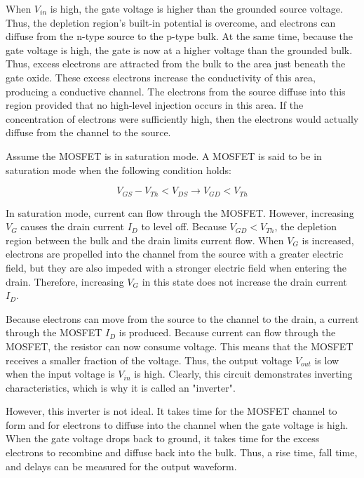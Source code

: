 When $V_{in}$ is high, the gate voltage is higher than the grounded source voltage. Thus, the depletion region's built-in potential is overcome, and electrons can diffuse from the n-type source to the p-type bulk. At the same time, because the gate voltage is high, the gate is now at a higher voltage than the grounded bulk. Thus, excess electrons are attracted from the bulk to the area just beneath the gate oxide. These excess electrons increase the conductivity of this area, producing a conductive channel. The electrons from the source diffuse into this region provided that no high-level injection occurs in this area. If the concentration of electrons were sufficiently high, then the electrons would actually diffuse from the channel to the source.

Assume the MOSFET is in saturation mode. A MOSFET is said to be in saturation mode when the following condition holds:

\begin{equation}
	\label{eq:sat_mode}
	V_{GS} - V_{Th} < V_{DS} \rightarrow V_{GD} < V_{Th}
\end{equation}

In saturation mode, current can flow through the MOSFET. However, increasing $V_{G}$ causes the drain current $I_{D}$ to level off. Because $V_{GD} < V_{Th}$, the depletion region between the bulk and the drain limits current flow. When $V_{G}$ is increased, electrons are propelled into the channel from the source with a greater electric field, but they are also impeded with a stronger electric field when entering the drain. Therefore, increasing $V_{G}$ in this state does not increase the drain current $I_D$.

Because electrons can move from the source to the channel to the drain, a current through the MOSFET $I_D$ is produced. Because current can flow through the MOSFET, the resistor can now consume voltage. This means that the MOSFET receives a smaller fraction of the voltage. Thus, the output voltage $V_{out}$ is low when the input voltage is $V_{in}$ is high. Clearly, this circuit demonstrates inverting characteristics, which is why it is called an "inverter".

However, this inverter is not ideal. It takes time for the MOSFET channel to form and for electrons to diffuse into the channel when the gate voltage is high. When the gate voltage drops back to ground, it takes time for the excess electrons to recombine and diffuse back into the bulk. Thus, a rise time, fall time, and delays can be measured for the output waveform. 

